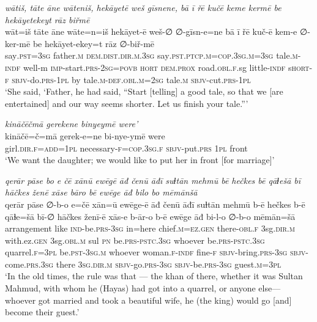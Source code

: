 \ea \label{ŽH.27}
\textit{wātiš, tāte āne wāteniš, hekāyetē weš gīsnene, bā ī řē kučē keme kermē be hekāyetekeyt rāz biřmē} \\ 
\gll wāt=iš tāte āne wāte=n=iš hekāyet-ē weš-∅ ∅-gīsn-e=ne bā ī řē kuč-ē kem-e ∅-ker-mē be hekāyet-ekey=t rāz ∅-biř-mē \\ 
 say\textsc{.pst}\textsc{=3sg} father\textsc{.m} \textsc{dem.dist}\textsc{.dir}\textsc{.m}\textsc{.3sg} say\textsc{.pst}\textsc{.ptcp}\textsc{.m}\textsc{=cop}\textsc{.3sg}\textsc{.m}\textsc{=3sg} tale\textsc{.m}\textsc{-indf} well-m \textsc{imp-}start\textsc{.prs}-\textsc{2sg}\textsc{=\textsc{povb}} \textsc{hort} \textsc{dem.prox} road\textsc{.obl}\textsc{\textsc{.f}}.sg little\textsc{-indf} s\textsc{hort}\textsc{-f} \textsc{sbjv-}do\textsc{.prs}\textsc{-1pl} by tale\textsc{.m}\textsc{-def}\textsc{.obl}\textsc{.m}\textsc{=\textsc{2sg}} tale\textsc{.m} \textsc{sbjv-}cut\textsc{.prs}\textsc{-1pl} \\ 
\glt `She said, ‘Father, he had said, “Start [telling] a good tale, so that we [are entertained] and our way seems shorter. Let us finish your tale.”'
\z 
 
\ea \label{ŽH.56}
\textit{kināčēčmā gerekene binyeymē were’} \\ 
\gll kināčē=č=mā gerek-e=ne bi-nye-ymē were \\ 
 girl\textsc{.dir}\textsc{\textsc{.f}}\textsc{=add}\textsc{=1pl} necessary\textsc{-f}\textsc{=cop}\textsc{.3sg}\textsc{\textsc{.f}} \textsc{sbjv-}put\textsc{.prs} \textsc{1pl} front \\ 
\glt `We want the daughter; we would like to put her in front [for marriage]'
\z 
 
\ea \label{ŽH.64}
\textit{qerār pāse bo e čē xānū ewēgē āđ čenū āđī suɫtān mehmū bē hečkes bē qāɫešā bī hāčkes ženē xāse bāro bē ewēge āđ bilo bo mēmānšā} \\ 
\gll qerār pāse ∅-b-o e=čē xān=ū ewēge-ē āđ čenū āđī suɫtān mehmū b-ē hečkes b-ē qāɫe=šā bī-∅ hāčkes ženī-ē xās-e b-ār-o b-ē ewēge āđ bi-l-o ∅-b-o mēmān=šā \\ 
 arrangement like \textsc{ind-}be\textsc{.prs}\textsc{-3sg} in=here chief\textsc{.m}\textsc{=ez}\textsc{.gen} there\textsc{-obl}\textsc{\textsc{.f}} 3sg\textsc{.dir}\textsc{.m} with.ez\textsc{.gen} 3sg\textsc{.obl}\textsc{.m} sul \textsc{pn} be\textsc{.prs}\textsc{-pstc}\textsc{.3sg} whoever be\textsc{.prs}\textsc{-pstc}\textsc{.3sg} quarrel\textsc{\textsc{.f}}\textsc{=3pl} be\textsc{.pst}\textsc{-3sg}\textsc{.m} whoever woman\textsc{\textsc{.f}}\textsc{-indf} fine\textsc{-f} \textsc{sbjv-}bring\textsc{.prs}\textsc{-3sg} \textsc{sbjv-}come\textsc{.prs}\textsc{.3sg} there \textsc{3sg}\textsc{.dir}\textsc{.m} \textsc{sbjv-}go\textsc{.prs}\textsc{-3sg} \textsc{sbjv-}be\textsc{.prs}\textsc{-3sg} guest\textsc{.m}\textsc{=3pl} \\ 
\glt `In the old times, the rule was that — the khan of there, whether it was Sultan Mahmud, with whom he (Hayas) had got into a quarrel, or anyone else— whoever got married and took a beautiful wife, he (the king) would go [and] become their guest.'
\z 
 
